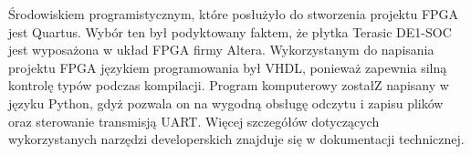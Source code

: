 Środowiskiem programistycznym, które posłużyło do stworzenia projektu FPGA jest Quartus. Wybór ten był podyktowany faktem, że płytka Terasic DE1-SOC jest wyposażona w układ FPGA firmy Altera. Wykorzystanym do napisania projektu FPGA językiem programowania był VHDL, ponieważ zapewnia silną kontrolę typów podczas kompilacji. Program komputerowy zostałZ napisany w języku Python, gdyż pozwala on na wygodną obsługę odczytu i zapisu plików oraz sterowanie transmisją UART. Więcej szczegółów dotyczących wykorzystanych narzędzi developerskich znajduje się w dokumentacji technicznej.


\newpage